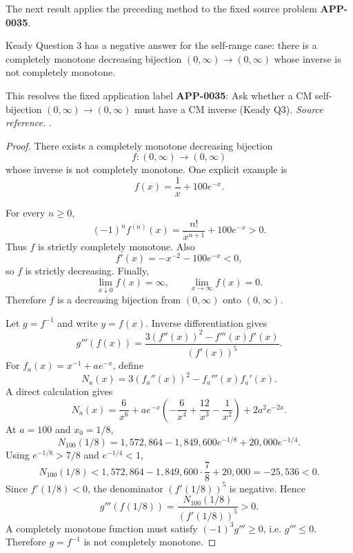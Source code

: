 The next result applies the preceding method to the fixed source problem \textbf{APP-0035}.
\begin{counterexample}
\label{res:keady-q3-self-bijection-inverse-cm-negative-answer}
Keady Question 3 has a negative answer for the self-range case: there is a completely monotone decreasing bijection \((0,\infty)\to(0,\infty)\) whose inverse is not completely monotone.

This resolves the fixed application label \textbf{APP-0035}: Ask whether a CM self-bijection \((0,\infty)\to(0,\infty)\) must have a CM inverse (Keady Q3).
\emph{Source reference.} \cite{app-app-0035-source}.
\end{counterexample}
\begin{proof}
There exists a completely monotone decreasing bijection
\[
f:(0,\infty)\to(0,\infty)
\]
whose inverse is not completely monotone. One explicit example is
\[
f(x)=\frac1x+100e^{-x}.
\]

For every \(n\ge0\),
\[
(-1)^n f^{(n)}(x)=\frac{n!}{x^{n+1}}+100e^{-x}>0.
\]
Thus \(f\) is strictly completely monotone. Also
\[
f'(x)=-x^{-2}-100e^{-x}<0,
\]
so \(f\) is strictly decreasing. Finally,
\[
\lim_{x\downarrow0}f(x)=\infty,
\qquad
\lim_{x\to\infty}f(x)=0.
\]
Therefore \(f\) is a decreasing bijection from \((0,\infty)\) onto \((0,\infty)\).

Let \(g=f^{-1}\) and write \(y=f(x)\). Inverse differentiation gives
\[
g'''(f(x))=\frac{3(f''(x))^2-f'''(x)f'(x)}{(f'(x))^5}.
\]
For \(f_a(x)=x^{-1}+ae^{-x}\), define
\[
N_a(x)=3(f_a''(x))^2-f_a'''(x)f_a'(x).
\]
A direct calculation gives
\[
N_a(x)=\frac6{x^6}+ae^{-x}\left(-\frac6{x^4}+\frac{12}{x^3}-\frac1{x^2}\right)+2a^2e^{-2x}.
\]
At \(a=100\) and \(x_0=1/8\),
\[
N_{100}(1/8)=1{,}572{,}864-1{,}849{,}600e^{-1/8}+20{,}000e^{-1/4}.
\]
Using \(e^{-1/8}>7/8\) and \(e^{-1/4}<1\),
\[
N_{100}(1/8)<1{,}572{,}864-1{,}849{,}600\cdot\frac78+20{,}000=-25{,}536<0.
\]
Since \(f'(1/8)<0\), the denominator \((f'(1/8))^5\) is negative. Hence
\[
g'''(f(1/8))=\frac{N_{100}(1/8)}{(f'(1/8))^5}>0.
\]
A completely monotone function must satisfy \((-1)^3g'''\ge0\), i.e. \(g'''\le0\). Therefore \(g=f^{-1}\) is not completely monotone.
\end{proof}

\appendix
